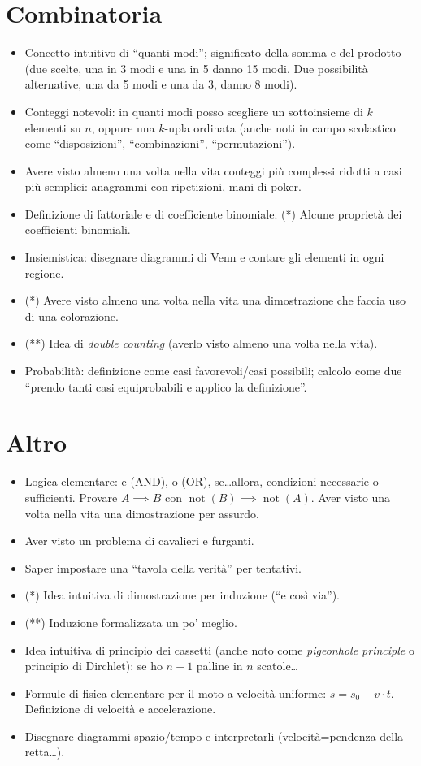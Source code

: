 \documentclass[a4paper,10pt]{paper}
\renewcommand{\star}{(*)}
\newcommand{\sstar}{(**)}
\begin{document}
\section{Combinatoria}
\begin{itemize}
 \item Concetto intuitivo di ``quanti modi''; significato della somma e del prodotto (due scelte, una in 3 modi e una in 5 danno 15 modi. Due possibilità alternative, una da 5 modi e una da 3, danno 8 modi).
 \item Conteggi notevoli: in quanti modi posso scegliere un sottoinsieme di $k$ elementi su $n$, oppure una $k$-upla ordinata (anche noti in campo scolastico come ``disposizioni'', ``combinazioni'', ``permutazioni'').
 \item Avere visto almeno una volta nella vita conteggi più complessi ridotti a casi più semplici: anagrammi con ripetizioni, mani di poker.
 \item Definizione di fattoriale e di coefficiente binomiale. \star{} Alcune proprietà dei coefficienti binomiali.
 \item Insiemistica: disegnare diagrammi di Venn e contare gli elementi in ogni regione.
 \item \star{} Avere visto almeno una volta nella vita una dimostrazione che faccia uso di una colorazione.
 \item \sstar{} Idea di \emph{double counting} (averlo visto almeno una volta nella vita).
 \item Probabilità: definizione come casi favorevoli/casi possibili; calcolo come due ``prendo tanti casi equiprobabili e applico la definizione''.
\end{itemize}

\section{Altro}
\begin{itemize}
 \item Logica elementare: e (AND), o (OR), se\dots{}allora, condizioni necessarie o sufficienti. Provare $A \implies B$ con $\operatorname{not}(B)\implies \operatorname{not}(A)$. Aver visto una volta nella vita una dimostrazione per assurdo.
 \item Aver visto un problema di cavalieri e furganti.
 \item Saper impostare una ``tavola della verità'' per tentativi.
 \item \star{} Idea intuitiva di dimostrazione per induzione (``e così via'').
 \item \sstar{} Induzione formalizzata un po' meglio.
 \item Idea intuitiva di principio dei cassetti (anche noto come \emph{pigeonhole principle} o principio di Dirchlet): se ho $n+1$ palline in $n$ scatole\dots
 \item Formule di fisica elementare per il moto a velocità uniforme: $s=s_0+v\cdot t$. Definizione di velocità e accelerazione.
 \item Disegnare diagrammi spazio/tempo e interpretarli (velocità=pendenza della retta\dots).
\end{itemize}
\end{document}
